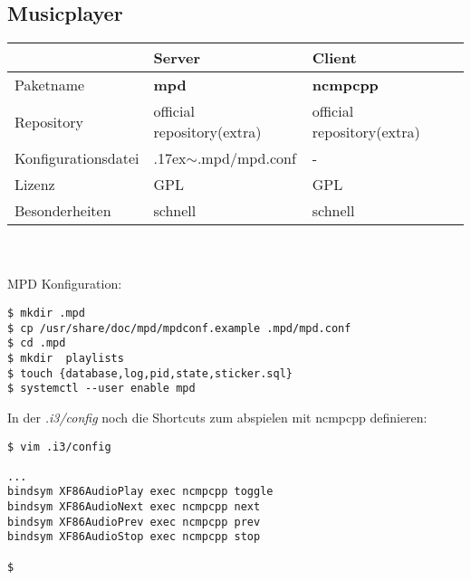 \subsection{Musicplayer}
\begin{tabular}{l|l|l}
~ & Server & Client \\ \hline
Paketname & \textbf{mpd} & \textbf{ncmpcpp} \\ 
Repository & official repository(extra) & official repository(extra) \\
Konfigurationsdatei & {{\raise.17ex\hbox{$\scriptstyle\mathtt{\sim}$}}.mpd/mpd.conf} & - \\
Lizenz & GPL & GPL \\
Besonderheiten & schnell & schnell\\
\end{tabular}
\\ \\
MPD Konfiguration:
\begin{lstlisting}[style=Bash]
$ mkdir .mpd
$ cp /usr/share/doc/mpd/mpdconf.example .mpd/mpd.conf
$ cd .mpd
$ mkdir  playlists
$ touch {database,log,pid,state,sticker.sql}
$ systemctl --user enable mpd
\end{lstlisting}
In der \emph{.i3/config} noch die Shortcuts zum abspielen mit ncmpcpp definieren:
\begin{lstlisting}[style=Bash]
$ vim .i3/config

...
bindsym XF86AudioPlay exec ncmpcpp toggle
bindsym XF86AudioNext exec ncmpcpp next
bindsym XF86AudioPrev exec ncmpcpp prev
bindsym XF86AudioStop exec ncmpcpp stop

$
\end{lstlisting}

